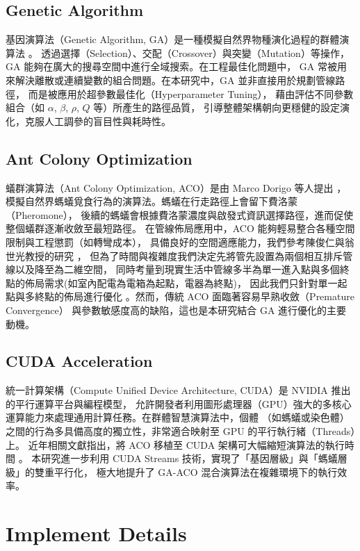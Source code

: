 \documentclass[conference]{IEEEtran}
\begin{document}
\subsection{Genetic Algorithm}
基因演算法（Genetic Algorithm, GA）是一種模擬自然界物種演化過程的群體演算法 \cite{b5}。
透過選擇（Selection）、交配（Crossover）與突變（Mutation）等操作，
GA 能夠在廣大的搜尋空間中進行全域搜索。在工程最佳化問題中，
GA 常被用來解決離散或連續變數的組合問題。在本研究中，GA 並非直接用於規劃管線路徑，
而是被應用於超參數最佳化（Hyperparameter Tuning），
藉由評估不同參數組合（如 $\alpha$, $\beta$, $\rho$, $Q$ 等）所產生的路徑品質，
引導整體架構朝向更穩健的設定演化，克服人工調參的盲目性與耗時性。

\subsection{Ant Colony Optimization}
蟻群演算法（Ant Colony Optimization, ACO）是由 Marco Dorigo 等人提出 \cite{b6}，
模擬自然界螞蟻覓食行為的演算法。螞蟻在行走路徑上會留下費洛蒙（Pheromone），
後續的螞蟻會根據費洛蒙濃度與啟發式資訊選擇路徑，進而促使整個蟻群逐漸收斂至最短路徑。
在管線佈局應用中，ACO 能夠輕易整合各種空間限制與工程懲罰（如轉彎成本），
具備良好的空間適應能力，我們參考陳俊仁與翁世光教授的研究 \cite{b2}，
但為了時間與複雜度我們決定先將管先設置為兩個相互排斥管線以及降至為二維空間，
同時考量到現實生活中管線多半為單一進入點與多個終點的佈局需求(如室內配電為電箱為起點，電器為終點)，
因此我們只針對單一起點與多終點的佈局進行優化
。然而，傳統 ACO 面臨著容易早熟收斂（Premature Convergence）
與參數敏感度高的缺陷，這也是本研究結合 GA 進行優化的主要動機。

\subsection{CUDA Acceleration}
統一計算架構（Compute Unified Device Architecture, CUDA）是 NVIDIA 推出的平行運算平台與編程模型，
允許開發者利用圖形處理器（GPU）強大的多核心運算能力來處理通用計算任務。在群體智慧演算法中，個體
（如螞蟻或染色體）之間的行為多具備高度的獨立性，非常適合映射至 GPU 的平行執行緒（Threads）上。
近年相關文獻指出，將 ACO 移植至 CUDA 架構可大幅縮短演算法的執行時間 \cite{b7}。
本研究進一步利用 CUDA Streams 技術，實現了「基因層級」與「螞蟻層級」的雙重平行化，
極大地提升了 GA-ACO 混合演算法在複雜環境下的執行效率。

\section{Implement Details}
\end{document}
